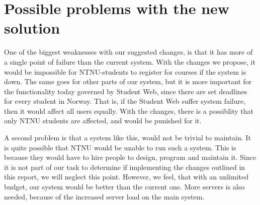 \chapter{Possible problems with the new solution}
One of the biggest weaknesses with our suggested changes, is that it has more of a single point of failure than the current system. With the changes we propose, it would be impossible for NTNU-students to register for courses if the system is down. The same goes for other parts of our system, but it is more important for the functionality today governed by Student Web, since there are set deadlines for every student in Norway. That is, if the Student Web suffer system failure, then it would affect all users equally. With the changes, there is a possiblity that only NTNU students are affected, and would be punished for it. 

A second problem is that a system like this, would not be trivial to maintain. It is quite possible that NTNU would be unable to run such a system. This is because they would have to hire people to design, program and maintain it. Since it is not part of our task to determine if implementing the changes outlined in this report, we will neglect this point. However,  we feel, that with an unlimited budget, our system would be better than the current one. More servers is also needed, because of the increased server load on the main system. 

